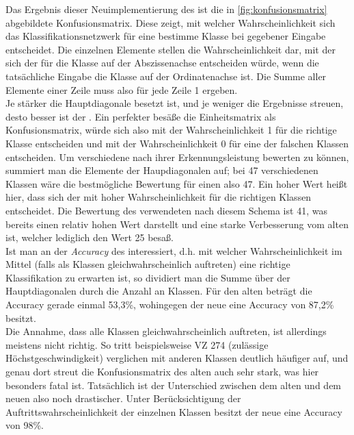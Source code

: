 \documentclass[12pt,a4paper,ngerman,enabledeprecatedfontcommands]{scrreprt}
\begin{document}
Das Ergebnis dieser Neuimplementierung des  ist die in \cref{fig:konfusionsmatrix} abgebildete Konfusionsmatrix. Diese zeigt, mit welcher Wahrscheinlichkeit sich das \gls{Klassifikation}snetzwerk für eine bestimme Klasse bei gegebener Eingabe entscheidet. Die einzelnen Elemente stellen die Wahrscheinlichkeit dar, mit der sich der  für die Klasse auf der Abszissenachse entscheiden würde, wenn die tatsächliche Eingabe die Klasse auf der Ordinatenachse ist. Die Summe aller Elemente einer Zeile muss also für jede Zeile 1 ergeben.\\
Je stärker die Hauptdiagonale besetzt ist, und je weniger die Ergebnisse streuen, desto besser ist der . Ein perfekter  besäße die Einheitsmatrix als Konfusionsmatrix, würde sich also mit der Wahrscheinlichkeit 1 für die richtige Klasse entscheiden und mit der Wahrscheinlichkeit 0 für eine der falschen Klassen entscheiden. Um verschiedene  nach ihrer Erkennungsleistung bewerten zu können, summiert man die Elemente der Haupdiagonalen auf; bei 47 verschiedenen Klassen wäre die bestmögliche Bewertung für einen  also 47. Ein hoher Wert heißt hier, dass sich der  mit hoher Wahrscheinlichkeit für die richtigen Klassen entscheidet. Die Bewertung des verwendeten  nach diesem Schema ist 41, was bereits einen relativ hohen Wert darstellt und eine starke Verbesserung vom alten  ist, welcher lediglich den Wert 25 besaß.\\
Ist man an der \textit{Accuracy} des  interessiert, d.h. mit welcher Wahrscheinlichkeit im Mittel (falls als Klassen gleichwahrscheinlich auftreten) eine richtige \gls{Klassifikation} zu erwarten ist, so dividiert man die Summe über der Hauptdiagonalen durch die Anzahl an Klassen. Für den alten  beträgt die Accuracy gerade einmal 53,3\%, wohingegen der neue  eine Accuracy von 87,2\% besitzt.\\
Die Annahme, dass alle Klassen gleichwahrscheinlich auftreten, ist allerdings meistens nicht richtig. So tritt beispielsweise \gls{VZ} 274 (zulässige Höchstgeschwindigkeit) verglichen mit anderen Klassen deutlich häufiger auf, und genau dort streut die Konfusionsmatrix des alten  auch sehr stark, was hier besonders fatal ist. Tatsächlich ist der Unterschied zwischen dem alten und dem neuen  also noch drastischer. Unter Berücksichtigung der Auftrittswahrscheinlichkeit der einzelnen Klassen besitzt der neue  eine Accuracy von 98\%.\\
\end{document}
